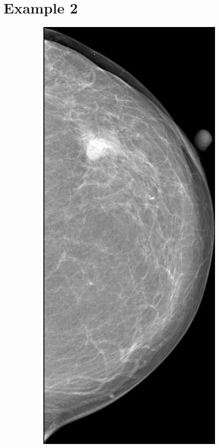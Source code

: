 \newpage
\section{Example 2}
\begin{figure}[h]
	\centering
	\begin{subfigure}{0.2\textwidth}
		\centering
			\includegraphics[width=\textwidth]{plots/examples/mammogram_2.png}

\end{subfigure}
\end{figure}

